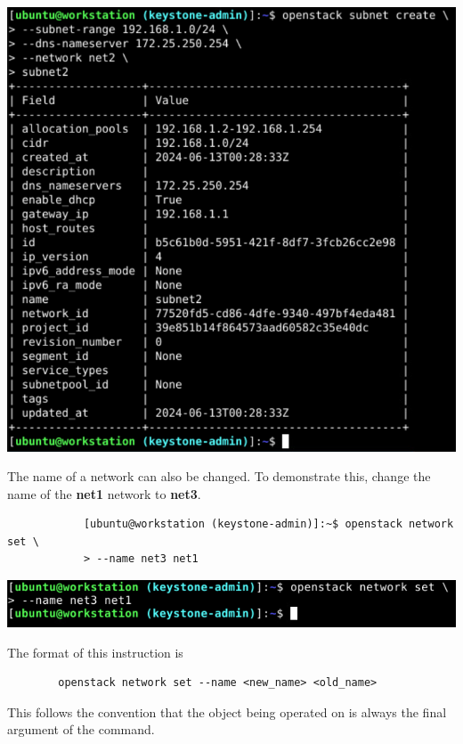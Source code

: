 \documentclass[letterpaper, 12pt]{article}
\begin{document}
\begin{enumerate}
\begin{labstep}
        \begin{center}
            \includegraphics[width=\linewidth]{images/part3/step13.png}
        \end{center}
    \end{labstep}

    \begin{labstep}
        The name of a network can also be changed.
        To demonstrate this, change the name of the \textbf{net1} network to \textbf{net3}.
        \begin{lstlisting}
            [ubuntu@workstation (keystone-admin)]:~$ openstack network set \
            > --name net3 net1
        \end{lstlisting}

        \begin{center}
            \includegraphics[width=\linewidth]{images/part3/step14.png}
        \end{center}
    \end{labstep}

    \begin{notebox}
        The format of this instruction is
        \begin{lstlisting}
        openstack network set --name <new_name> <old_name>
        \end{lstlisting}
        This follows the convention that the object being operated on is always the final argument of the command.
    \end{notebox}


\end{enumerate}
\end{document}
